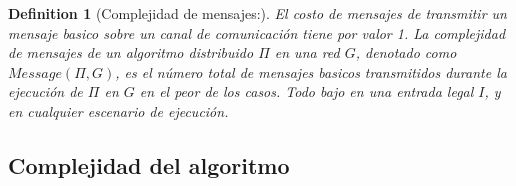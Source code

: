 \documentclass[10pt]{report}
\newtheorem{definition}{Definition}
\begin{document}
    \begin{definition}
        [Complejidad de mensajes:] El costo de mensajes de transmitir un mensaje basico sobre un canal de
        comunicación tiene por valor 1. La complejidad de mensajes de un algoritmo distribuido $\Pi$ en una red $G$,
        denotado como $Message(\Pi,G)$, es el número total de mensajes basicos transmitidos durante la ejecución de $\Pi$
        en $G$ en el peor de los casos.
        Todo bajo en una entrada legal $I$, y en cualquier escenario de ejecución.
    \end{definition}

    \subsection{Complejidad del algoritmo}\label{subsec:complejidad-del-algoritmo}
\end{document}
